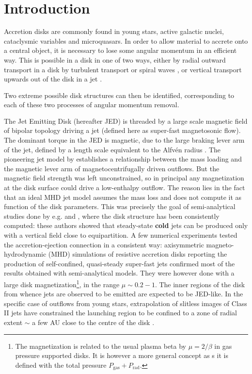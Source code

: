 \documentclass{aa}
\begin{document}
\section{Introduction}


Accretion disks are commonly found in young stars, active galactic nuclei, cataclysmic variables and microquasars.  In order to allow material to accrete onto a central object, it is necessary to lose
some angular momentum in an efficient way.  This is possible in a disk in one of two ways, either by radial outward transport in a disk by turbulent transport
\citep{1973A&A....24..337S,1974MNRAS.168..603L} or spiral waves \citep{1999A&A...349.1003T}, or vertical transport upwards out of the disk in a jet \citep{1982MNRAS.199..883B}.

Two extreme possible disk structures can then be identified, corresponding to each of these two processes of angular momentum removal.

The Jet Emitting Disk (hereafter JED) is threaded by a large scale magnetic field of bipolar topology driving a jet (defined here as super-fast magnetosonic flow). The dominant torque in the JED
is magnetic, due to the large braking lever arm of the jet, defined by a length scale equivalent to the Alfv\'en radius \citep{1992ApJ...394..117P}. 
The pioneering jet model by \citet{1982MNRAS.199..883B} establishes a relationship between the mass loading and the magnetic lever arm of magnetocentrifugally driven outflows. But the magnetic 
field strength was left unconstrained, so in principal any magnetization at the disk surface could drive a low-enthalpy outflow. The reason lies in the fact that an ideal MHD jet model assumes the mass
loss and does not compute it as function of the disk parameters. This was precisely the goal of semi-analytical studies done by e.g. \citet{1995A&A...295..807F} and \citet{1997A&A...319..340F}, where
the disk structure has been consistently computed: these authors showed that steady-state {\bf cold} jets can be produced only with a vertical field close to equipartition. 
A few numerical experiments tested the accretion-ejection connection in a consistent way: axisymmetric magneto-hydrodynamic (MHD) simulations of resistive
accretion disks reporting the production of self-confined, quasi-steady super-fast jets \citep{2002ApJ...581..988C, 2004ApJ...601...90C, 2007A&A...469..811Z, 2009MNRAS.400..820T}
confirmed most of the results obtained with semi-analytical models. They were however done with a large disk magnetization\footnote{The magnetization is related to the usual plasma beta by 
$\mu= 2/\beta$ in gas pressure supported disks. It is however a more general concept as s it is defined with the total pressure $P_\mathrm{gas} +P_\mathrm{rad}$.}, in the range $\mu \sim 0.2 - 1$.
The inner regions of the disk from whence jets are observed to be emitted are expected to be JED-like. In the specific case of outflows from young stars, extrapolation of slitless images of Class II jets 
have constrained the launching region to be confined to a zone of radial extent $\sim$ a few AU close to the centre of the disk \citep{2004ApJ...609..261H,2007LNP...723...21C}.
\end{document}
